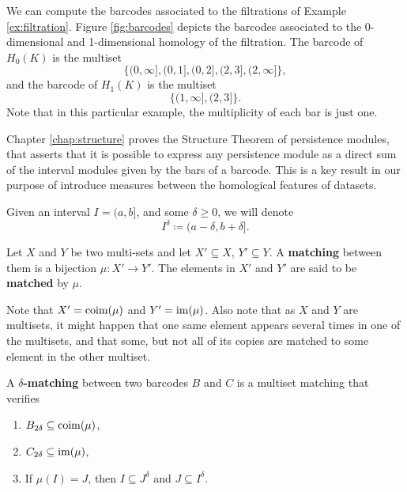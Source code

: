 \begin{example}[Barcodes] \label{ex:barcodes}
    We can compute the barcodes associated to the filtrations of Example \ref{ex:filtration}. Figure \ref{fig:barcodes} depicts the barcodes associated to the 0-dimensional and 1-dimensional homology of the filtration. The barcode of $H_0(K)$ is the multiset
    \begin{equation}
        \{(0, \infty], (0, 1], (0, 2], (2,3], (2,\infty]\},
    \end{equation}
    and the barcode of $H_1(K)$ is the multiset
    \begin{equation}
        \{(1, \infty], (2, 3]\}.
    \end{equation}
    Note that in this particular example, the multiplicity of each bar is just one.
    
\end{example}

Chapter \ref{chap:structure} proves the Structure Theorem of persistence modules, that asserts that it is possible to express any persistence module as a direct sum of the interval modules given by the bars of a barcode. This is a key result in our purpose of introduce measures between the homological features of datasets. 

Given an interval $ I = (a, b]$, and some $ \delta \geq 0 $, we will denote
\begin{equation}
    I^\delta \coloneq (a-\delta, b+\delta].
\end{equation}

\begin{definition}
    Let $ X $ and $ Y $ be two multi-sets and let $ X' \subseteq X $, $ Y' \subseteq Y$. A {\bf matching} between them is a bijection $ \mu \colon X' \to Y' $. The elements in $ X' $ and $ Y' $ are said to be {\bf matched} by $ \mu $.
\end{definition}

Note that $ X' = \operatorname{coim}(\mu) $ and $ Y' = \operatorname{im}(\mu) $. Also note that as $ X $ and $ Y $ are multisets, it might happen that one same element appears several times in one of the multisets, and that some, but not all of its copies are matched to some element in the other multiset. 

\begin{definition} \label{delta-matching}
    A {\bf $\delta$-matching} between two barcodes $ B $ and $ C $ is a multiset matching that verifies
    \begin{enumerate}
        \item $B_{2\delta} \subseteq \operatorname{coim}(\mu) $,
        \item $C_{2\delta} \subseteq \operatorname{im}(\mu) $,
        \item If $\mu(I) = J$, then $I \subseteq J^\delta$ and $J \subseteq I^\delta$.
    \end{enumerate}
\end{definition}

